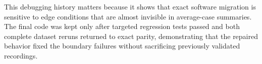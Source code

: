 This debugging history matters because it shows that exact software migration is sensitive to edge conditions that are almost invisible in average-case summaries. The final code was kept only after targeted regression tests passed and both complete dataset reruns returned to exact parity, demonstrating that the repaired behavior fixed the boundary failures without sacrificing previously validated recordings.
